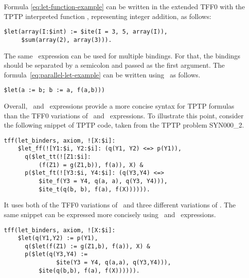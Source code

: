 Formula \eqref{eq:let-function-example} can be written in the extended TFF0 with the TPTP interpreted function \dsum, representing integer addition, as follows:
\begin{lstlisting}
$let(array(I:$int) := $ite(I = 3, 5, array(I)),
     $sum(array(2), array(3))).
\end{lstlisting}



The same \dlet\ expression can be used for multiple bindings. For that, the bindings should be separated by a semicolon and passed as the first argument. The formula~\eqref{eq:parallel-let-example} can be written using \dlet\ as follows.
\begin{lstlisting}
$let(a := b; b := a, f(a,b)))
\end{lstlisting}

Overall, \dite\ and \dlet\ expressions provide a more concise syntax for TPTP formulas than the TFF0 variations of \ITE\ and \LETIN\  expressions. To illustrate this point, consider the following snippet of TPTP code, taken from the TPTP problem \mbox{SYN000\_2}.
\begin{lstlisting}
tff(let_binders, axiom, ![X:$i]:
    $let_ff(![Y1:$i, Y2:$i]: (q(Y1, Y2) <=> p(Y1)),
      q($let_tt(![Z1:$i]:
          (f(Z1) = g(Z1,b)), f(a)), X) &
      p($let_ft(![Y3:$i, Y4:$i]: (q(Y3,Y4) <=>
          $ite_f(Y3 = Y4, q(a, a), q(Y3, Y4))),
          $ite_t(q(b, b), f(a), f(X)))))).
\end{lstlisting}

It uses both of the TFF0 variations of \ITE\ and three different variations of \LETIN. The same snippet can be expressed more concisely using \dite\ and \dlet\ expressions.
\begin{lstlisting}
tff(let_binders, axiom, ![X:$i]:
    $let(q(Y1,Y2) := p(Y1),
      q($let(f(Z1) := g(Z1,b), f(a)), X) &
      p($let(q(Y3,Y4) :=
               $ite(Y3 = Y4, q(a,a), q(Y3,Y4))),
          $ite(q(b,b), f(a), f(X)))))).
\end{lstlisting}
